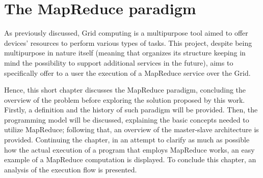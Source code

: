\chapter{The MapReduce paradigm}
As previously discussed, Grid computing is a multipurpose tool aimed to offer devices' resources to perform various types of tasks. This project, despite being multipurpose in nature itself (meaning that organizes its structure keeping in mind the possibility to support additional services in the future), aims to specifically offer to a user the execution of a MapReduce service over the Grid.

Hence, this short chapter discusses the MapReduce paradigm, concluding the overview of the problem before exploring the solution proposed by this work. Firstly, a definition and the history of such paradigm will be provided. Then, the programming model will be discussed, explaining the basic concepts needed to utilize MapReduce; following that, an overview of the master-slave architecture is provided. Continuing the chapter, in an attempt to clarify as much as possible how the actual execution of a program that employs MapReduce works, an easy example of a MapReduce computation is displayed. To conclude this chapter, an analysis of the execution flow is presented.






